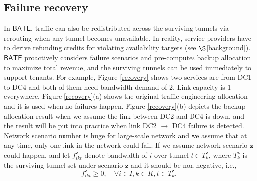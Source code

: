 \documentclass[sigconf]{acmart}
\begin{document}
\subsection{Failure recovery} \label{backup}
In $\mathsf{BATE}$,  traffic can also be redistributed across the surviving tunnels via rerouting when any tunnel becomes unavailable.
In reality, service providers have to derive refunding credits for violating availability targets (see $\S$\ref{background}).
$\mathsf{BATE}$ proactively considers failure scenarios and pre-computes backup allocation to maximize total revenue, and the surviving tunnels can be used immediately to support tenants.
For example, Figure \ref{recovery} shows two services are from DC1 to DC4 and both of them need bandwidth demand of 2.
Link capacity is 1 everywhere.
Figure \ref{recovery}(a) shows the original traffic engineering allocation and it is used when no failures happen.
Figure \ref{recovery}(b) depicts the backup allocation result when we assume the link between DC2 and DC4 is down, and the result will be put into practice when link DC2 $\to$ DC4 failure is detected.
Network scenario number is huge for large-scale network and we assume that at any time, only one link in the network could fail. 
If we assume network scenario $ \bm{z}$ could happen, and let $f^{\bm{z}}_{ikt}$ denote bandwidth of $i$ over tunnel $t\in T^{ \bm{z}}_k$, where $T^ { \bm{z}}_k$ is the surviving tunnel set under scenario $ \bm{z}$ and it should be non-negative, i.e.,
\begin{equation}
f^{\bm{z}}_{ikt} \ge 0, \quad\forall i \in I ,  k\in K,   t\in T^{\bm{z}}_k.
\label{constraint-f3}
\end{equation}
\end{document}
